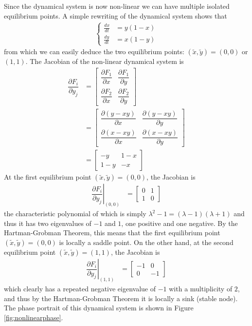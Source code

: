 \begin{solution}
Since the dynamical system is now non-linear we can have multiple isolated equilibrium points. A simple rewriting of the dynamical system shows that
\begin{align*}
\left\{
\begin{aligned}
\frac{dx}{dt} &= y (1-x) \\
\frac{dy}{dt} &= x (1-y)
\end{aligned}
\right.
\end{align*}
from which we can easily deduce the two equilibrium points: $(\tilde{x}, \tilde{y}) = (0,0)$ or $(1,1)$. The Jacobian of the non-linear dynamical system is
\begin{align*}
\dfrac{\partial F_i}{\partial y_j} &= 
\begin{bmatrix}
\dfrac{\partial F_1}{\partial x} & \dfrac{\partial F_1}{\partial y} \\[10pt]
\dfrac{\partial F_2}{\partial x} & \dfrac{\partial F_2}{\partial y}
\end{bmatrix} \\
&= 
\begin{bmatrix}
\dfrac{\partial (y-xy)}{\partial x} & \dfrac{\partial (y-xy)}{\partial y} \\[10pt]
\dfrac{\partial (x-xy)}{\partial x} & \dfrac{\partial (x-xy)}{\partial y}
\end{bmatrix} \\
&= 
\begin{bmatrix}
-y & 1-x \\
1-y & -x
\end{bmatrix}
\end{align*}
At the first equilibrium point $(\tilde{x}, \tilde{y}) = (0,0)$, the Jacobian is
\begin{align*}
\left.\dfrac{\partial F_i}{\partial y_j}\right|_{(0,0)} &= 
\begin{bmatrix}
0 & 1 \\
1 & 0
\end{bmatrix}
\end{align*}
the characteristic polynomial of which is simply $\lambda^2 - 1 = (\lambda - 1)(\lambda + 1)$ and thus it has two eigenvalues of $-1$ and $1$, one positive and one negative. By the Hartman-Grobman Theorem, this means that the first equilibrium point $(\tilde{x}, \tilde{y}) = (0,0)$ is locally a saddle point. On the other hand, at the second equilibrium point $(\tilde{x}, \tilde{y}) = (1,1)$, the Jacobian is
\begin{align*}
\left.\dfrac{\partial F_i}{\partial y_j}\right|_{(1,1)} &= 
\begin{bmatrix}
-1 & 0 \\
0 & -1
\end{bmatrix}
\end{align*}
which clearly has a repeated negative eigenvalue of $-1$ with a multiplicity of $2$, and thus by the Hartman-Grobman Theorem it is locally a sink (stable node). The phase portrait of this dynamical system is shown in Figure \ref{fig:nonlinearphase}.
\end{solution}
